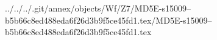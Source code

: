 ../../../.git/annex/objects/Wf/Z7/MD5E-s15009--b5b66c8ed488eda6f26d3b9f5ce45fd1.tex/MD5E-s15009--b5b66c8ed488eda6f26d3b9f5ce45fd1.tex